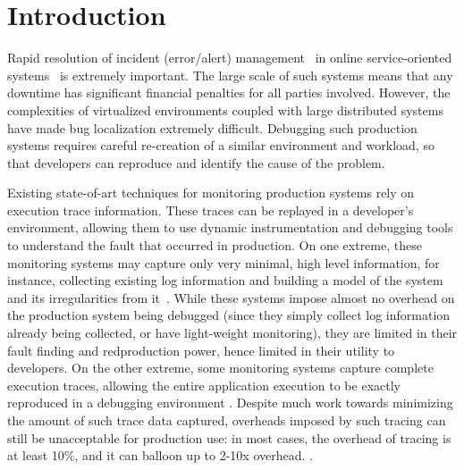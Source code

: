 \section{Introduction}
\label{sec:parikshan-intro}

Rapid resolution of incident (error/alert) management~\cite{sasase2013} in online service-oriented systems~\cite{microservice-book,hdfs,cassandra,redis} is extremely important.
The large scale of such systems means that any downtime has significant financial penalties for all parties involved.
However, the complexities of virtualized environments coupled with large distributed systems have made bug localization extremely difficult.
Debugging such production systems requires careful re-creation of a similar
environment and workload, so that developers can reproduce and identify the cause of the problem.

Existing state-of-art techniques for monitoring production systems rely on execution trace information. 
These traces can be replayed in a developer's environment, allowing them to use dynamic instrumentation and debugging tools to understand the fault that occurred in production.
On one extreme, these monitoring systems may capture only very minimal, high
level information, for instance, collecting existing log information and
building a model of the system and its irregularities from it~\cite{magpie,fay,failuresketching,problemsolvingSysTap}. 
While these systems impose almost no overhead on the production system being
debugged (since they simply collect log information already being collected, or
have light-weight monitoring), they are limited in their fault finding and redproduction power, hence limited in their utility to developers.
On the other extreme, some monitoring systems capture complete execution traces, allowing the entire application execution to be exactly reproduced in a debugging environment \cite{odr,revirt,laadan2010transparent,geels2007friday}.
Despite much work towards minimizing the amount of such trace data captured, overheads imposed by such tracing can still be unacceptable for production use: in most cases, the overhead of tracing is at least 10\%, and it can balloon up to 2-10x overhead. \cite{pinplay,drdebug}.

